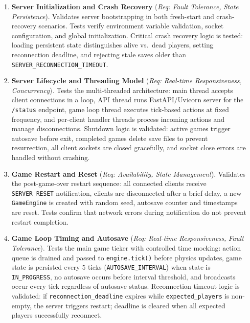 \begin{enumerate}
    \item \textbf{Server Initialization and Crash Recovery} (\textit{Req: Fault Tolerance, State Persistence}).
          Validates server bootstrapping in both fresh-start and crash-recovery scenarios.
          Tests verify environment variable validation, socket configuration, and global initialization.
          Critical crash recovery logic is tested: loading persistent state distinguishes alive vs.\ dead players, setting reconnection deadline, and rejecting stale saves older than \texttt{SERVER\_RECONNECTION\_TIMEOUT}.

    \item \textbf{Server Lifecycle and Threading Model} (\textit{Req: Real-time Responsiveness, Concurrency}).
          Tests the multi-threaded architecture: main thread accepts client connections in a loop, API thread runs FastAPI/Uvicorn server for the \texttt{/status} endpoint, game loop thread executes tick-based actions at fixed frequency, and per-client handler threads process incoming actions and manage disconnections.
          Shutdown logic is validated: active games trigger autosave before exit, completed games delete save files to prevent resurrection, all client sockets are closed gracefully, and socket close errors are handled without crashing.

    \item \textbf{Game Restart and Reset} (\textit{Req: Availability, State Management}).
          Validates the post-game-over restart sequence: all connected clients receive \texttt{SERVER\_RESET} notification, clients are disconnected after a brief delay, a new \texttt{GameEngine} is created with random seed, autosave counter and timestamps are reset.
          Tests confirm that network errors during notification do not prevent restart completion.

    \item \textbf{Game Loop Timing and Autosave} (\textit{Req: Real-time Responsiveness, Fault Tolerance}).
          Tests the main game ticker with controlled time mocking: action queue is drained and passed to \texttt{engine.tick()} before physics updates, game state is persisted every 5 ticks (\texttt{AUTOSAVE\_INTERVAL}) when state is \texttt{IN\_PROGRESS}, no autosave occurs before interval threshold, and broadcasts occur every tick regardless of autosave status.
          Reconnection timeout logic is validated: if \texttt{reconnection\_deadline} expires while \texttt{expected\_players} is non-empty, the server triggers restart; deadline is cleared when all expected players successfully reconnect.


\end{enumerate}
